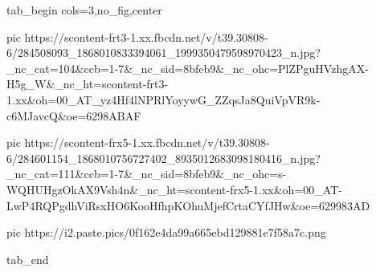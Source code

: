  
 
 
 
 


\ifcmt
  tab_begin cols=3,no_fig,center

     pic https://scontent-frt3-1.xx.fbcdn.net/v/t39.30808-6/284508093_1868010833394061_1999350479598970423_n.jpg?_nc_cat=104&ccb=1-7&_nc_sid=8bfeb9&_nc_ohc=PlZPguHVzhgAX-H5g_W&_nc_ht=scontent-frt3-1.xx&oh=00_AT_yz4Hf4lNPRlYoyywG_ZZqsJa8QuiVpVR9k-c6MJavcQ&oe=6298ABAF

     pic https://scontent-frx5-1.xx.fbcdn.net/v/t39.30808-6/284601154_1868010756727402_8935012683098180416_n.jpg?_nc_cat=111&ccb=1-7&_nc_sid=8bfeb9&_nc_ohc=s-WQHUHgzOkAX9Vsh4n&_nc_ht=scontent-frx5-1.xx&oh=00_AT-LwP4RQPgdhViRsxHO6KooHfhpKOhuMjefCrtaCYfJHw&oe=629983AD

     pic https://i2.paste.pics/0f162e4da99a665ebd129881e7f58a7c.png

  tab_end
\fi

